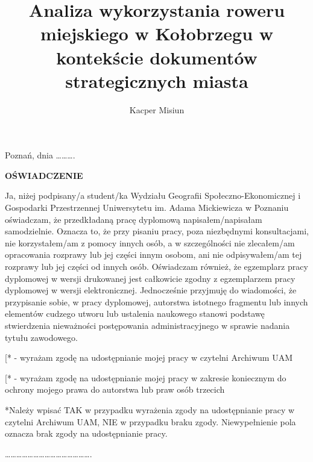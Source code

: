 \documentclass{amuthesis}
\author{Kacper Misiun}
\title{Analiza wykorzystania roweru miejskiego w Kołobrzegu w kontekście dokumentów strategicznych miasta}
\begin{document}

\titlepage

\newpage
\setlength\parindent{24pt}

\hfill Poznań, dnia \ldots\ldots\ldots.

\begin{center}
\large{\textbf{OŚWIADCZENIE}}
\end{center}

\indent Ja, niżej podpisany/a student/ka Wydziału Geografii Społeczno-Ekonomicznej i Gospodarki Przestrzennej Uniwersytetu im. Adama Mickiewicza w Poznaniu oświadczam, że przedkładaną pracę dyplomową napisałem/napisałam samodzielnie. Oznacza to, że przy pisaniu pracy, poza niezbędnymi konsultacjami, nie korzystałem/am z pomocy innych osób, a w szczególności nie zlecałem/am opracowania rozprawy lub jej części innym osobom, ani nie odpisywałem/am tej rozprawy lub jej części od innych osób. \newline
\indent Oświadczam również, że egzemplarz pracy dyplomowej w wersji drukowanej jest całkowicie zgodny z egzemplarzem pracy dyplomowej w wersji elektronicznej. \newline
\indent Jednocześnie przyjmuję do wiadomości, że przypisanie sobie, w pracy dyplomowej, autorstwa istotnego fragmentu lub innych elementów cudzego utworu lub ustalenia naukowego stanowi podstawę stwierdzenia nieważności postępowania administracyjnego w sprawie nadania tytułu zawodowego.

{[}\hspace{0.6cm}{]}* - wyrażam zgodę na udostępnianie mojej pracy w czytelni Archiwum UAM

{[}\hspace{0.6cm}{]}* - wyrażam zgodę na udostępnianie mojej pracy w zakresie koniecznym do ochrony mojego prawa do autorstwa lub praw osób trzecich

\vspace{5mm}

\begin{footnotesize}
*Należy wpisać TAK w przypadku wyrażenia zgody na udostępnianie pracy w czytelni Archiwum UAM, NIE w przypadku braku zgody. Niewypełnienie pola oznacza brak zgody na udostępnianie pracy.
\end{footnotesize}

\vspace{20mm}

\hfill\ldots\ldots\ldots\ldots\ldots\ldots\ldots\ldots\ldots\ldots\ldots\ldots\ldots\ldots\ldots. \newline
\null\hfill
\end{document}
